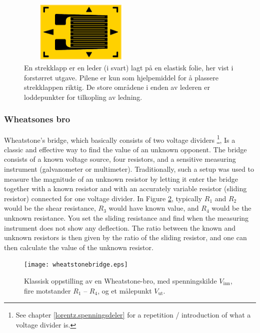 \documentclass[../Elmag-labhefte-2020.tex]{subfiles}
\begin{document}
\begin{figure}[h!b]
    \centering
    \includegraphics[width=6.01cm,height=3cm,keepaspectratio]{fig/strekklapp.png}
    \caption{%
        En strekklapp er en leder (i svart) lagt på en elastisk folie, her vist i forstørret utgave. Pilene er kun som hjelpemiddel for å plassere strekklappen riktig. De store områdene i enden av lederen er loddepunkter for tilkopling av ledning.
    }   
    \label{fig:strekklapp}
\end{figure}


\subsubsection{Wheatsones bro} \vspace{-5mm}
Wheatstone's bridge, which basically consists of two voltage dividers \footnote{See chapter \ref{lorentz.spenningsdeler} for a repetition / introduction of what a voltage divider is.}, Is a classic and effective way to find the value of an unknown opponent. The bridge consists of a known voltage source, four resistors, and a sensitive measuring instrument (galvanometer or multimeter). Traditionally, such a setup was used to measure the magnitude of an unknown resistor by letting it enter the bridge together with a known resistor and with an accurately variable resistor (sliding resistor) connected for one voltage divider.
In Figure \ref{fig:wheatstonebridge}, typically $R_1$ and $R_2$ would be the shear resistance, $R_3$ would have known value, and $R_4$ would be the unknown resistance. You set the sliding resistance and find when the measuring instrument does not show any deflection. The ratio between the known and unknown resistors is then given by the ratio of the sliding resistor, and one can then calculate the value of the unknown resistor.


\begin{figure}[htbp]
    \centering
    \texttt{[image: wheatstonebridge.eps]}
    \caption{%
        Klassisk oppstilling av en Wheatstone-bro, med spenningskilde $V_\text{inn}$, fire motstander $R_1$ -- $R_4$, og et målepunkt $V_\text{ut}$.
    }
    \label{fig:wheatstonebridge}
\end{figure}
\end{document}
